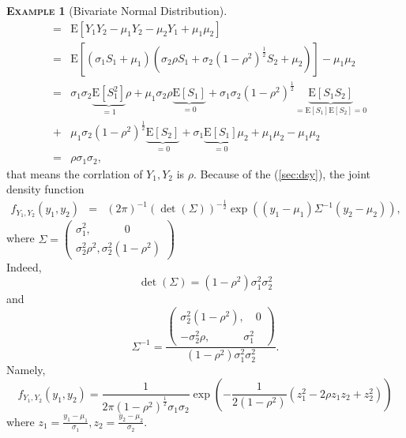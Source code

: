 \documentclass[a4paper, twoside, 11pt]{article}
\theoremstyle{definition}
\newtheorem{example}[definition]{\scshape Example}
\newcommand{\brkt}[1]{\left({#1} \right)}
\begin{document}
\begin{example}[Bivariate Normal Distribution]
\begin{eqnarray*}
						 &=& \mathrm{E}[Y_1Y_2 - \mu_1Y_2 - \mu_2Y_1 + \mu_1\mu_2]\\
						 &=& \mathrm{E}[(\sigma_1 S_1 + \mu_1)(\sigma_2\rho S_1 + \sigma_2(1-\rho^2)^{\frac{1}{2}}S_2 + \mu_2)] - \mu_1\mu_2\\
						 &=& \sigma_1\sigma_2\underbrace{\mathrm{E}[S_1^2]}_{=1}\rho + \mu_1\sigma_2\rho\underbrace{\mathrm{E}[S_1]}_{=0} +
						 \sigma_1\sigma_2(1-\rho^2)^{\frac{1}{2}}\underbrace{\mathrm{E}[S_1S_2]}_{=\mathrm{E}[S_1]\mathrm{E}[S_2]=0} \\
						 &+& \mu_1\sigma_2(1-\rho^2)^{\frac{1}{2}}\underbrace{\mathrm{E}[S_2]}_{=0} + \sigma_1\underbrace{\mathrm{E}[S_1]}_{=0}\mu_2 + \mu_1\mu_2 - \mu_1\mu_2\\
						 &=& \rho\sigma_1\sigma_2,
	\end{eqnarray*}
	that means the corrlation of $Y_1, Y_2$ is $\rho$.
	Because of the (\ref{sec:dsy}), the joint density function
	\begin{eqnarray*}
	  f_{Y_1, Y_2}(y_1, y_2) &=& (2\pi)^{-1} (\det(\Sigma))^{-\frac{1}{2}} \exp\brkt{(y_1 - \mu_1) \Sigma^{-1} (y_2 - \mu_2)},
	\end{eqnarray*}
	where $\Sigma =\left(
    \begin{array}{l}
	  \sigma_1^2, \hspace{3em}0 \\
	  \sigma_2^2\rho^2, \sigma_2^2(1-\rho^2)
    \end{array}
  \right)
 $\\
 Indeed, 
 $$
 	\det(\Sigma) = (1-\rho^2)\sigma_1^2\sigma_2^2
 $$ and 
 $$
 \Sigma^{-1} = \frac{
   \left(
    \begin{array}{l}
	  \sigma_2^2(1-\rho^2), \hspace{1em}0 \\
	  -\sigma_2^2\rho,\hspace{3em}\sigma_1^2
    \end{array}
  \right)}
  {\displaystyle (1-\rho^2)\sigma_1^2\sigma_2^2}.
  $$
 Namely,
 \begin{equation}
   f_{Y_1, Y_2}(y_1, y_2) = \frac{1}{2\pi(1 - \rho^2)^{\frac{1}{2}}\sigma_1\sigma_2}\exp\brkt{-\frac{1}{2(1-\rho^2)}(z_1^2 - 2\rho z_1 z_2 + z_2^2)}
   \label{sec:jdt}
 \end{equation}
 where $z_1 = \frac{y_1-\mu_1}{\sigma_1}, z_2=\frac{y_2-\mu_2}{\sigma_2}$.
\end{example}
\end{document}
